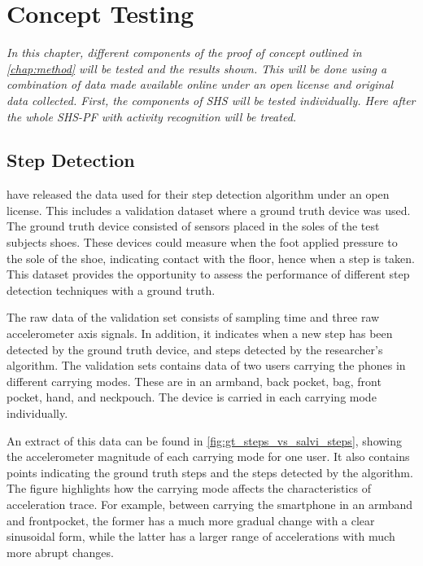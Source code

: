 \chapter{Concept Testing}

\textit{In this chapter, different components of the proof of concept outlined in \cref{chap:method} will be tested and the results shown. This will be done using a combination of data made available online under an open license and original data collected. First, the components of SHS will be tested individually. Here after the whole SHS-PF with activity recognition will be treated.}

\section{Step Detection}
\citet{Salvi2018} have released the data used for their step detection algorithm under an open license. This includes a validation dataset where a ground truth device was used. The ground truth device consisted of sensors placed in the soles of the test subjects shoes. These devices could measure when the foot applied pressure to the sole of the shoe, indicating contact with the floor, hence when a step is taken. This dataset provides the opportunity to assess the performance of different step detection techniques with a ground truth.\par

The raw data of the validation set consists of sampling time and three raw accelerometer axis signals. In addition, it indicates when a new step has been detected by the ground truth device, and steps detected by the researcher's algorithm. The validation sets contains data of two users carrying the phones in different carrying modes. These are in an armband, back pocket, bag, front pocket, hand, and neckpouch. The device is carried in each carrying mode individually.\par

An extract of this data can be found in \cref{fig:gt_steps_vs_salvi_steps}, showing the accelerometer magnitude of each carrying mode for one user. It also contains points indicating the ground truth steps and the steps detected by the \citet{Salvi2018} algorithm. The figure highlights how the carrying mode affects the characteristics of acceleration trace. For example, between carrying the smartphone in an armband and frontpocket, the former has a much more gradual change with a clear sinusoidal form, while the latter has a larger range of accelerations with much more abrupt changes. 


